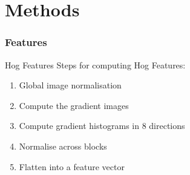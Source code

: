 \documentclass{beamer}
\newcommand{\slide}[2]
{
\begin{frame}
\frametitle{#1} 

#2

\end{frame}
}
\begin{document}
\section{Methods}
\slide{Features}
{
	\begin{block}{Hog Features}
	Steps for computing Hog Features\cite{dalal2005histograms}:
	\begin{enumerate}
		\item Global image normalisation
		\item Compute the gradient images
		\item Compute gradient histograms in 8 directions
		\item Normalise across blocks
		\item Flatten into a feature vector
	\end{enumerate}
	\end{block}
}
\end{document}
